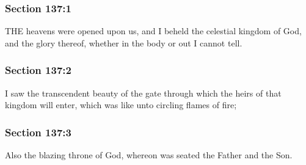 	\subsubsection{Section 137:1} %
		\label{DC137-1}

		THE heavens were opened upon us, and I beheld the celestial kingdom of God, and the glory thereof, whether in the body or out I cannot tell.


	\subsubsection{Section 137:2} %
		\label{DC137-2}

		I saw the transcendent beauty of the gate through which the heirs of that kingdom will enter, which was like unto circling flames of fire;


	\subsubsection{Section 137:3} %
		\label{DC137-3}

		Also the blazing throne of God, whereon was seated the Father and the Son.


